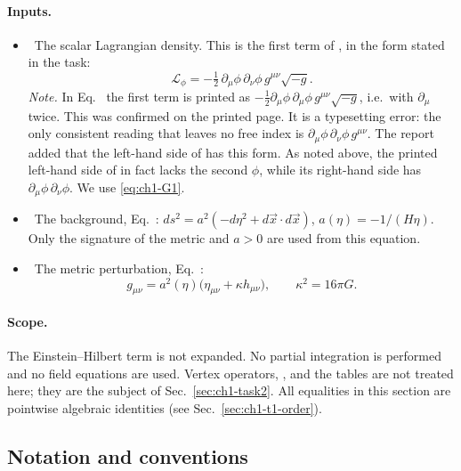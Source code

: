 \paragraph{Inputs.}
\begin{itemize}[leftmargin=1.4em]
\item[(In1)] \tP\ The scalar Lagrangian density. This is the first term of
, in the form stated in the task:
\begin{equation*}
\mathcal L_\phi=-\tfrac12\,\partial_\mu\phi\,\partial_\nu\phi\,g^{\mu\nu}\sqrt{-g}.
\tag{In1}\label{eq:ch1-G1}
\end{equation*}
\emph{Note.} In Eq.~ the first term is printed as
$-\tfrac12\partial_\mu\phi\,\partial_\mu\phi\,g^{\mu\nu}\sqrt{-g}$, i.e.\ with
$\partial_\mu$ twice. This was confirmed on the printed page. It is a
typesetting error: the only consistent reading that leaves no free index is
$\partial_\mu\phi\,\partial_\nu\phi\,g^{\mu\nu}$. The report added that the
left-hand side of  has this form. As noted above, the printed
left-hand side of  in fact lacks the second $\phi$, while its
right-hand side has $\partial_\mu\phi\,\partial_\nu\phi$. We use \eqref{eq:ch1-G1}.
\item[(In2)] \tP\ The background, Eq.~:
$ds^2=a^2(-d\eta^2+d\vec x\cdot d\vec x)$, $a(\eta)=-1/(H\eta)$. Only the
signature of the metric and $a>0$ are used from this equation.
\item[(In3)] \tP\ The metric perturbation, Eq.~:
\begin{equation*}
g_{\mu\nu}=a^2(\eta)\big(\eta_{\mu\nu}+\kappa h_{\mu\nu}\big),\qquad \kappa^2=16\pi G.
\tag{In3}\label{eq:ch1-G3}
\end{equation*}
\end{itemize}

\paragraph{Scope.} The Einstein--Hilbert term is not expanded. No partial
integration is performed and no field equations are used. Vertex operators,
,  and the tables are not treated here; they are the subject of
Sec.~\ref{sec:ch1-task2}. All equalities in this section are pointwise
algebraic identities (see Sec.~\ref{sec:ch1-t1-order}).

\subsection{Notation and conventions}
\label{sec:ch1-t1-notation}

